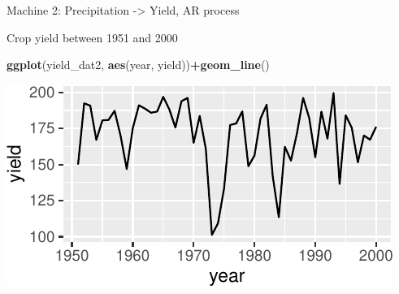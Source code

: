 \documentclass[
  12pt,
  ignorenonframetext,
  aspectratio=169,
]{beamer}
\newenvironment{Shaded}{\begin{snugshade}}{\end{snugshade}}
\newcommand{\KeywordTok}[1]{\textcolor[rgb]{0.13,0.29,0.53}{\textbf{#1}}}
\newcommand{\NormalTok}[1]{#1}
\newcommand{\OperatorTok}[1]{\textcolor[rgb]{0.81,0.36,0.00}{\textbf{#1}}}
\begin{document}
\begin{frame}[fragile]{Machine 2: Precipitation -\textgreater{} Yield,
AR process}
\protect\hypertarget{machine-2-precipitation---yield-ar-process-2}{}

\begin{block}{Crop yield between 1951 and 2000}

\begin{Shaded}
\begin{Highlighting}[]
\KeywordTok{ggplot}\NormalTok{(yield_dat2, }\KeywordTok{aes}\NormalTok{(year, yield))}\OperatorTok{+}\KeywordTok{geom_line}\NormalTok{()}
\end{Highlighting}
\end{Shaded}

\begin{center}\includegraphics{Lecture-2_files/figure-beamer/unnamed-chunk-8-1} \end{center}

\end{block}

\end{frame}
\end{document}
